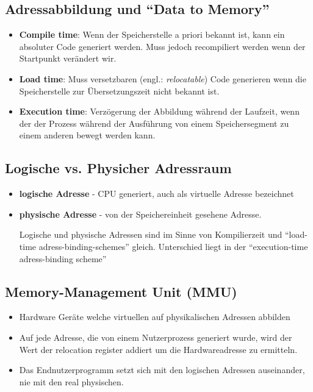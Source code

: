 \documentclass[a4paper]{scrreprt}
\begin{document}
\subsection{Adressabbildung und "`Data to Memory"'}

\begin{itemize}
\item \textbf{Compile time}: Wenn der Speicherstelle  a priori bekannt ist, kann ein absoluter Code generiert werden. Muss jedoch recompiliert werden wenn der Startpunkt verändert wir.
\item \textbf{Load time}: Muss versetzbaren (engl.: \textit{relocatable}) Code generieren wenn die Speicherstelle zur Übersetzungszeit nicht bekannt ist.
\item \textbf{Execution time}: Verzögerung der Abbildung während der Laufzeit, wenn der der Prozess während der Ausführung von einem Speichersegment zu einem anderen bewegt werden kann. 
\end{itemize}

\subsection{Logische vs. Physicher Adressraum}

\begin{itemize}
\item \textbf{logische Adresse} - CPU generiert, auch als virtuelle Adresse bezeichnet
\item \textbf{physische Adresse} - von der Speichereinheit gesehene Adresse.

Logische und physische Adressen sind im Sinne von Kompilierzeit und "`load-time adress-binding-schemes"' gleich. Unterschied liegt in der "`execution-time adress-binding scheme"'
\end{itemize}

\subsection{Memory-Management Unit (MMU)}
\begin{itemize}
\item Hardware Geräte welche virtuellen auf physikalischen Adressen abbilden
\item Auf jede Adresse, die von einem Nutzerprozess generiert wurde, wird der Wert der relocation register addiert um die Hardwareadresse zu ermitteln.
\item Das Endnutzerprogramm setzt sich mit den logischen Adressen auseinander, nie mit den real physischen.
\end{itemize}
\end{document}
